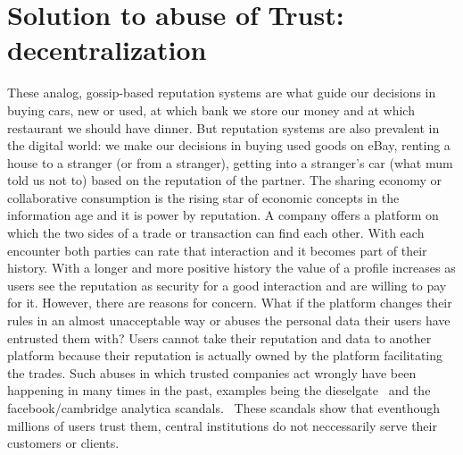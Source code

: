 \section{Solution to abuse of Trust: decentralization}
These analog, gossip-based reputation systems are what guide our decisions in buying cars, new or 
used, at which bank we store our money and at which restaurant we should have dinner.
But reputation systems are also prevalent in the digital world: we make our decisions in buying used goods 
on eBay, renting a house to a stranger (or from a stranger), getting into a stranger's car 
(what mum told us not to) based on the reputation of the partner. The sharing economy or collaborative consumption is the 
rising star of economic concepts in the information age and it is power by reputation. A company 
offers a platform on which the two sides of a trade or transaction can find each other. With each 
encounter both parties can rate that interaction and it becomes part of their history. With a longer
and more positive history the value of a profile increases as users see the reputation as security
for a good interaction and are willing to pay for it. However, there are reasons for concern. What
if the platform changes their rules in an almost unacceptable way or abuses the personal data their
users have entrusted them with? Users cannot take their reputation and data to another platform
because their reputation is actually owned by the platform facilitating the trades. Such abuses
in which trusted companies act wrongly have been happening in many times in the past, examples being
the dieselgate~\cite{VWDiesel} and the facebook/cambridge analytica scandals.~\cite{facebook} These
scandals show that eventhough millions of users trust them, central institutions do not neccessarily
serve their customers or clients. 


